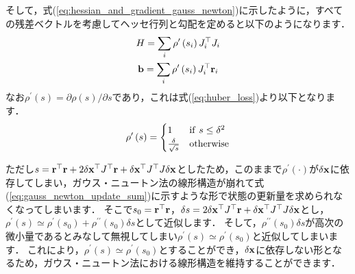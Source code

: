 そして，式(\ref{eq:hessian_and_gradient_gauss_newton})に示したように，すべての残差ベクトルを考慮してヘッセ行列と勾配を定めると以下のようになります．
%
\begin{align}
  \begin{gathered}
    H = \sum_{i} \rho^{\prime} \left( s_{i} \right) J_{i}^{\top} J_{i} \\
    {\bf b} = \sum_{i} \rho^{\prime} \left( s_{i} \right) J_{i}^{\top} {\bf r}_{i}
  \end{gathered}
  \label{eq:hessian_and_gradient_gauss_newton_huber_loss}
\end{align}
%
なお$\rho^{\prime} \left( s \right) = \partial \rho \left( s \right) / \partial s$であり，これは式(\ref{eq:huber_loss})より以下となります．
%
\begin{align}
  \rho^{\prime} \left( s \right)
  =
  \begin{cases}
    1                             & {\rm if} ~ s \leq \delta^{2} \\
    \frac{ \delta }{ \sqrt{ s } } & {\rm otherwise}
  \end{cases}
  \label{eq:huber_loss_prime}
\end{align}
%

ただし$s = {\bf r}^{\top} {\bf r} + 2 \delta {\bf x}^{\top} J^{\top} {\bf r} + \delta {\bf x}^{\top} J^{\top} J \delta {\bf x}$としたため，このままで$\rho^{\prime} \left( \cdot \right)$が$\delta {\bf x}$に依存してしまい，ガウス・ニュートン法の線形構造が崩れて式(\ref{eq:gauss_newton_update_sum})に示すような形で状態の更新量を求められなくなってしまいます．
そこで$s_{0} = {\bf r}^{\top} {\bf r}$，$\delta s = 2 \delta {\bf x}^{\top} J^{\top} {\bf r} + \delta {\bf x}^{\top} J^{\top} J \delta {\bf x}$とし，$\rho^{\prime} \left( s \right) \simeq \rho^{\prime} \left( s_{0} \right) + \rho^{\prime \prime} \left( s_{0} \right) \delta s$として近似します．
そして，$\rho^{\prime \prime} \left( s_{0} \right) \delta s$が高次の微小量であるとみなして無視してしまい$\rho^{\prime}(s) \simeq \rho^{\prime}(s_0)$と近似してしまいます．
これにより，$\rho^{\prime} \left( s \right) \simeq \rho^{\prime} \left( s_{0} \right)$とすることができ，$\delta {\bf x}$に依存しない形となるため，ガウス・ニュートン法における線形構造を維持することができます．

